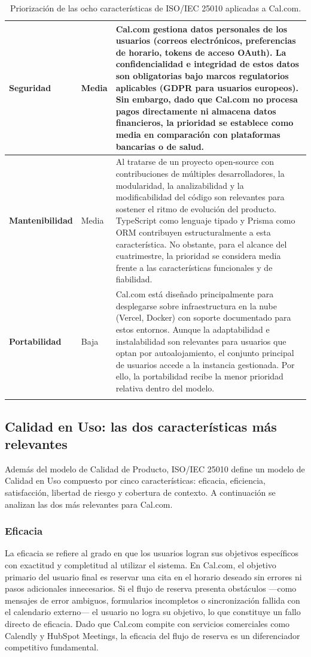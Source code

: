 \documentclass{article}
\begin{document}
\begin{longtable}{>{\bfseries}p{3.8cm} p{1.8cm} p{8.4cm}}
\midrule
Seguridad & Media &
Cal.com gestiona datos personales de los usuarios (correos electrónicos, preferencias de horario, tokens de acceso OAuth). La confidencialidad e integridad de estos datos son obligatorias bajo marcos regulatorios aplicables (GDPR para usuarios europeos). Sin embargo, dado que Cal.com no procesa pagos directamente ni almacena datos financieros, la prioridad se establece como media en comparación con plataformas bancarias o de salud. \\
\midrule
Mantenibilidad & Media &
Al tratarse de un proyecto open‑source con contribuciones de múltiples desarrolladores, la modularidad, la analizabilidad y la modificabilidad del código son relevantes para sostener el ritmo de evolución del producto. TypeScript como lenguaje tipado y Prisma como ORM contribuyen estructuralmente a esta característica. No obstante, para el alcance del cuatrimestre, la prioridad se considera media frente a las características funcionales y de fiabilidad. \\
\midrule
Portabilidad & Baja &
Cal.com está diseñado principalmente para desplegarse sobre infraestructura en la nube (Vercel, Docker) con soporte documentado para estos entornos. Aunque la adaptabilidad e instalabilidad son relevantes para usuarios que optan por autoalojamiento, el conjunto principal de usuarios accede a la instancia gestionada. Por ello, la portabilidad recibe la menor prioridad relativa dentro del modelo. \\
\bottomrule
\caption{Priorización de las ocho características de ISO/IEC 25010 aplicadas a Cal.com.}
\label{tab:prioridad_25010}
\end{longtable}

\subsection{Calidad en Uso: las dos características más relevantes}

Además del modelo de Calidad de Producto, ISO/IEC 25010 define un modelo de Calidad en Uso compuesto por cinco características: eficacia, eficiencia, satisfacción, libertad de riesgo y cobertura de contexto. A continuación se analizan las dos más relevantes para Cal.com.

\subsubsection{Eficacia}

La eficacia se refiere al grado en que los usuarios logran sus objetivos específicos con exactitud y completitud al utilizar el sistema. En Cal.com, el objetivo primario del usuario final es reservar una cita en el horario deseado sin errores ni pasos adicionales innecesarios. Si el flujo de reserva presenta obstáculos —como mensajes de error ambiguos, formularios incompletos o sincronización fallida con el calendario externo— el usuario no logra su objetivo, lo que constituye un fallo directo de eficacia. Dado que Cal.com compite con servicios comerciales como Calendly y HubSpot Meetings, la eficacia del flujo de reserva es un diferenciador competitivo fundamental.
\end{document}
